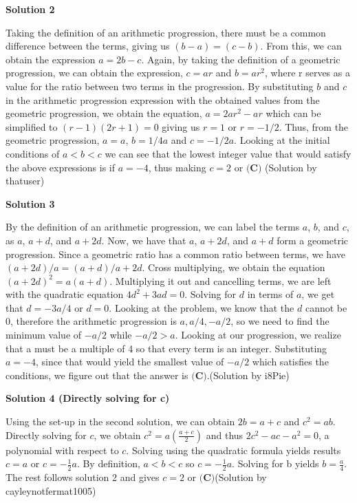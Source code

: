 \begin{enumerate}
\textbf{Solution 2}

Taking the definition of an arithmetic progression, there must be a common difference between the terms, giving us $(b-a) = (c-b)$. From this, we can obtain the expression $a = 2b-c$. Again, by taking the definition of a geometric progression, we can obtain the expression, $c=ar$ and $b=ar^2$, where r serves as a value for the ratio between two terms in the progression. By substituting $b$ and $c$ in the arithmetic progression expression with the obtained values from the geometric progression, we obtain the equation, $a=2ar^2-ar$ which can be simplified to $(r-1)(2r+1)=0$ giving us $r=1$ or $r=-1/2$. Thus, from the geometric progression, $a=a$, $b=1/4a$ and $c=-1/2a$. Looking at the initial conditions of $a<b<c$ we can see that the lowest integer value that would satisfy the above expressions is if $a = -4$, thus making $c=2$ or $\boxed{\textbf{(C)}}$ (Solution by thatuser)

 



\textbf{Solution 3}

By the definition of an arithmetic progression, we can label the terms $a$, $b$, and $c$, as $a$, $a+d$, and $a+2d$. Now, we have that $a$, $a+2d$, and $a+d$ form a geometric progression. Since a geometric ratio has a common ratio between terms, we have $(a+2d)/a = (a+d)/a+2d$. Cross multiplying, we obtain the equation $(a+2d)^2=a(a+d)$. Multiplying it out and cancelling terms, we are left with the quadratic equation $4d^2+3ad=0$. Solving for $d$ in terms of $a$, we get that $d=-3a/4$ or $d=0$. Looking at the problem, we know that the $d$ cannot be 0, therefore the arithmetic progression is $a, a/4, -a/2$, so we need to find the minimum value of $-a/2$ while $-a/2>a$. Looking at our progression, we realize that a must be a multiple of 4 so that every term is an integer. Substituting $a=-4$, since that would yield the smallest value of $-a/2$ which satisfies the conditions, we figure out that the answer is $\boxed{\textbf{(C)}}$.(Solution by i8Pie)

 



\textbf{Solution 4 (Directly solving for c)}

Using the set-up in the second solution, we can obtain $2b=a+c$ and $c^2=ab$. Directly solving for $c$, we obtain $c^2=a(\frac{a+c}{2})$ and thus $2c^2-ac-a^2=0$, a polynomial with respect to $c$. Solving using the quadratic formula yields results $c=a$ or $c=-\frac{1}{2}a$. By definition, $a<b<c$ so $c=-\frac{1}{2}a$. Solving for b yields $b=\frac{a}{4}$. The rest follows solution 2 and gives $c=2$ or $\boxed{\textbf{(C)}}$(Solution by cayleynotfermat1005)


\end{enumerate}
